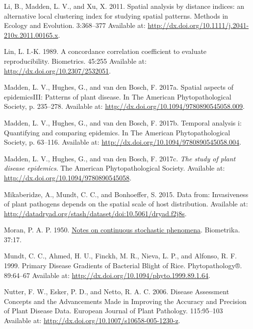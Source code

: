 \documentclass[
  letterpaper,
  DIV=11,
  numbers=noendperiod]{scrreprt}
\newlength{\cslhangindent}
\newlength{\cslentryspacingunit} %
\newenvironment{CSLReferences}[2] %
 {%
  \setlength{\parindent}{0pt}
  \ifodd #1
  \let\oldpar\par
  \def\par{\hangindent=\cslhangindent\oldpar}
  \fi
  \setlength{\parskip}{#2\cslentryspacingunit}
 }%
 {}
\begin{document}
\begin{CSLReferences}{0}{0}
\leavevmode{}%
Li, B., Madden, L. V., and Xu, X. 2011. Spatial analysis by distance
indices: an alternative local clustering index for studying spatial
patterns. Methods in Ecology and Evolution. 3:368--377 Available at:
\url{http://dx.doi.org/10.1111/j.2041-210x.2011.00165.x}.

\leavevmode{}%
Lin, L. I.-K. 1989. A concordance correlation coefficient to evaluate
reproducibility. Biometrics. 45:255 Available at:
\url{http://dx.doi.org/10.2307/2532051}.

\leavevmode{}%
Madden, L. V., Hughes, G., and van den Bosch, F. 2017a. Spatial aspects
of epidemics{\textemdash}III: Patterns of plant disease. In The American
Phytopathological Society, p. 235--278. Available at:
\url{http://dx.doi.org/10.1094/9780890545058.009}.

\leavevmode{}%
Madden, L. V., Hughes, G., and van den Bosch, F. 2017b. Temporal
analysis i: Quantifying and comparing epidemics. In The American
Phytopathological Society, p. 63--116. Available at:
\url{http://dx.doi.org/10.1094/9780890545058.004}.

\leavevmode{}%
Madden, L. V., Hughes, G., and van den Bosch, F. 2017c. \emph{The study
of plant disease epidemics}. The American Phytopathological Society.
Available at: \url{http://dx.doi.org/10.1094/9780890545058}.

\leavevmode{}%
Mikaberidze, A., Mundt, C. C., and Bonhoeffer, S. 2015. Data from:
Invasiveness of plant pathogens depends on the spatial scale of host
distribution. Available at:
\url{http://datadryad.org/stash/dataset/doi:10.5061/dryad.f2j8s}.

\leavevmode{}%
Moran, P. A. P. 1950. \href{https://doi.org/10.2307/2332142}{Notes on
continuous stochastic phenomena}. Biometrika. 37:17.

\leavevmode{}%
Mundt, C. C., Ahmed, H. U., Finckh, M. R., Nieva, L. P., and Alfonso, R.
F. 1999. Primary Disease Gradients of Bacterial Blight of Rice.
Phytopathology®. 89:64--67 Available at:
\url{http://dx.doi.org/10.1094/phyto.1999.89.1.64}.

\leavevmode{}%
Nutter, F. W., Esker, P. D., and Netto, R. A. C. 2006. Disease
Assessment Concepts and the Advancements Made in Improving the Accuracy
and Precision of Plant Disease Data. European Journal of Plant
Pathology. 115:95--103 Available at:
\url{http://dx.doi.org/10.1007/s10658-005-1230-z}.


\end{CSLReferences}
\end{document}
